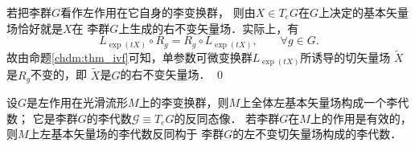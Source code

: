 \begin{example}\label{chlg:exm_ltmpa}
    若把李群$G$看作左作用在它自身的李变换群，
    则由$X \in T_e G$在$G$上决定的基本矢量场恰好就是$X$在
    李群$G$上生成的右不变矢量场．实际上，有
    \begin{equation}
        L_{\exp (t X)} \circ R_g = R_g \circ L_{\exp (t X)},\qquad \forall g \in G.
    \end{equation}
    故由命题\ref{chdm:thm_ivf}可知，单参数可微变换群$L_{\exp(t X)}$所诱导的切矢量场
    $\widetilde{X}$是$R_{g}$不变的，即 $\widetilde{X}$是$G$的右不变矢量场． \qed
\end{example}


\begin{theorem}\label{chlg:thm_liegaeb}
    设$G$是左作用在光滑流形$M$上的李变换群，则$M$上全体左基本矢量场构成一个李代数；
    它是李群$G$的李代数$\mathscr{G}\equiv T_e G$的{\kaishu 反}同态像．
    若李群$G$在$M$上的作用是有效的，则$M$上左基本矢量场的李代数{\kaishu 反}同构于
    李群$G$的左不变切矢量场构成的李代数．
\end{theorem}


